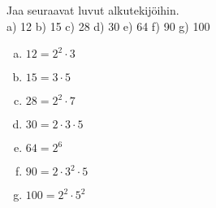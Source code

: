 \begin{tehtava}
Jaa seuraavat luvut alkutekijöihin.\\
a) 12 \quad b) 15 \quad c) 28 \quad d) 30 \quad e) 64 \quad f) 90 \quad g) 100

\begin{vastaus}
\begin{enumerate}[a)]
	\item $12 = 2^2 \cdot 3$
	\item $15 = 3 \cdot 5$
	\item $28 = 2^2 \cdot 7$
	\item $30 = 2 \cdot 3 \cdot 5$
	\item $64 = 2^6$
	\item $90 = 2 \cdot 3^2 \cdot 5$
	\item $100 = 2^2 \cdot 5^2$
\end{enumerate}
\end{vastaus}
\end{tehtava}